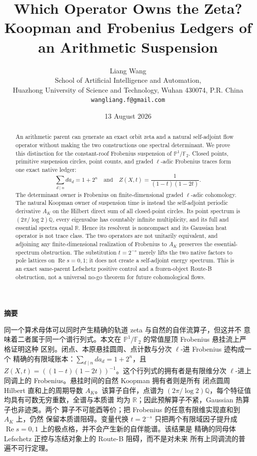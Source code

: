 \documentclass[11pt]{article}
\title{\textbf{Which Operator Owns the Zeta?}\\
Koopman and Frobenius Ledgers of an Arithmetic Suspension}
\author{Liang Wang\\
\small School of Artificial Intelligence and Automation,\\[-2pt]
\small Huazhong University of Science and Technology, Wuhan 430074, P.R. China\\
\small \texttt{wangliang.f@gmail.com}}
\date{13 August 2026}
\theoremstyle{remark}\newtheorem{remark}[theorem]{Remark}
\begin{document}
\maketitle

\begin{abstract}
An arithmetic parent can generate an exact orbit zeta and a natural
self-adjoint flow operator without making the two constructions one spectral
determinant.  We prove this distinction for the constant-roof Frobenius
suspension of \(\mathbb P^1/\mathbb F_2\).  Closed points, primitive suspension
circles, point counts, and graded \(\ell\)-adic Frobenius traces form one exact
native ledger:
\[
 \sum_{d\mid n}d a_d=1+2^n
 \quad\text{and}\quad
 Z(X,t)=\frac1{(1-t)(1-2t)}.
\]
The determinant owner is Frobenius on finite-dimensional graded \(\ell\)-adic
cohomology.  The natural Koopman owner of suspension time is instead the
self-adjoint periodic derivative \(A_K\) on the Hilbert direct sum of all
closed-point circles.  Its point spectrum is
\((2\pi/\log2)\mathbb Q\), every eigenvalue has countably infinite
multiplicity, and its full and essential spectra equal \(\mathbb R\).  Hence
its resolvent is noncompact and its Gaussian heat operator is not trace class.
The two operators are not unitarily equivalent, and adjoining any
finite-dimensional realization of Frobenius to \(A_K\) preserves the
essential-spectrum obstruction.  The substitution \(t=2^{-s}\) merely lifts
the two native factors to pole lattices on \(\operatorname{Re}s=0,1\); it does
not create a self-adjoint energy spectrum.  This is an exact same-parent
Lefschetz positive control and a frozen-object Route-B obstruction, not a
universal no-go theorem for future cohomological flows.
\end{abstract}

\ifPDFTeX\else
\begin{center}{\zhfont\bfseries 摘要}\end{center}
{\zhfont
同一个算术母体可以同时产生精确的轨道 zeta 与自然的自伴流算子，但这并不
意味着二者属于同一个谱行列式。本文在
\(\mathbb P^1/\mathbb F_2\) 的常值屋顶 Frobenius 悬挂流上严格证明这种
区别。闭点、本原悬挂圆周、点计数与分次 \(\ell\)-进 Frobenius 迹构成一个
精确的有限域账本：\(\sum_{d\mid n}d a_d=1+2^n\)，且
\(Z(X,t)=((1-t)(1-2t))^{-1}\)。这个行列式的拥有者是有限维分次
\(\ell\)-进上同调上的 Frobenius。悬挂时间的自然 Koopman 拥有者则是所有
闭点圆周 Hilbert 直和上的周期导数 \(A_K\)。该算子自伴，点谱为
\((2\pi/\log2)\mathbb Q\)，每个特征值均具有可数无穷重数，全谱与本质谱
均为 \(\mathbb R\)；因此预解算子不紧，Gaussian 热算子也非迹类。两个
算子不可能酉等价；把 Frobenius 的任意有限维实现直和到 \(A_K\) 上，仍然
保留本质谱阻碍。变量代换 \(t=2^{-s}\) 只把两个有限域因子提升成
\(\operatorname{Re}s=0,1\) 上的极点格，并不会产生新的自伴能谱。该结果是
精确的同母体 Lefschetz 正控与冻结对象上的 Route-B 阻碍，而不是对未来
所有上同调流的普遍不可行定理。
}
\fi
\end{document}
